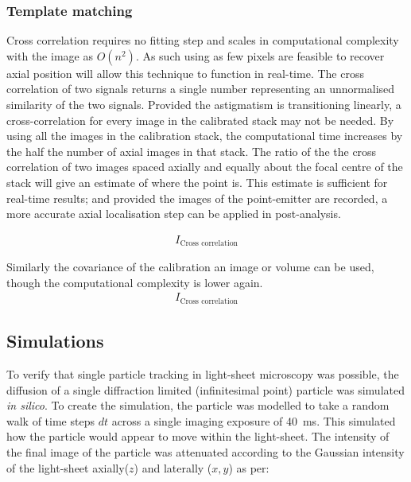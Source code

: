 \subsubsection{Template matching}


Cross correlation requires no fitting step and scales in computational complexity with the image as $O(n^2)$. %
As such using as few pixels are feasible to recover axial position will allow this technique to function in real-time.
The cross correlation of two signals returns a single number representing an unnormalised similarity of the two signals.
Provided the astigmatism is transitioning linearly, a cross-correlation for every image in the calibrated stack may not be needed.
By using all the images in the calibration stack, the computational time increases by the half the number of axial images in that stack.
The ratio of the the cross correlation of two images spaced axially and equally about the focal centre of the stack will give an estimate of where the point is.
This estimate is sufficient for real-time results; and provided the images of the point-emitter are recorded, a more accurate axial localisation step can be applied in post-analysis.

\begin{align}
  I_{\text{Cross correlation}}
\end{align}

Similarly the covariance of the calibration an image or volume can be used, though the computational complexity is lower again.
\begin{align}
  I_{\text{Cross correlation}}
\end{align}

\subsection{Simulations}

To verify that single particle tracking in light-sheet microscopy was possible, the diffusion of a single diffraction limited (infinitesimal point) particle was simulated \emph{in silico}.
To create the simulation, the particle was modelled to take a random walk of time steps $dt$ across a single imaging exposure of \SI{40}{\milli\second}.
This simulated how the particle would appear to move within the light-sheet.
The intensity of the final image of the particle was attenuated according to the Gaussian intensity of the light-sheet axially($z$) and laterally ($x,y$) as per:

